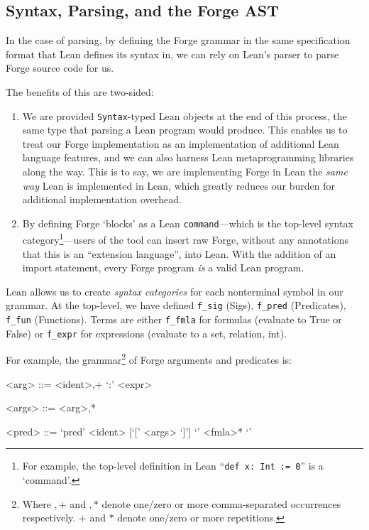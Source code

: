 \subsection{Syntax, Parsing, and the Forge AST}\label{sec:parsing}
In the case of parsing, by defining the Forge grammar in the same specification format that Lean defines its syntax in, we can rely on Lean's parser to parse Forge source code for us.

The benefits of this are two-sided:
\begin{enumerate}
  \item We are provided \texttt{Syntax}-typed Lean objects at the end of this process, the same type that parsing a Lean program would produce. This enables us to treat our Forge implementation as an implementation of additional Lean language features, and we can also harness Lean metaprogramming libraries along the way. This is to say, we are implementing Forge in Lean the \emph{same way} Lean is implemented in Lean, which greatly reduces our burden for additional implementation overhead.
  \item By defining Forge `blocks' as a Lean \texttt{command}---which is the top-level syntax category\footnote{For example, the top-level definition in Lean ``\texttt{def x: Int := 0}'' is a `command'.}---users of the tool can insert raw Forge, without any annotations that this is an ``extension language'', into Lean. With the addition of an import statement, every Forge program \emph{is} a valid Lean program.
\end{enumerate}

Lean allows us to create \emph{syntax categories} for each nonterminal symbol in our grammar. At the top-level, we have defined \texttt{f\_sig} (Sigs), \texttt{f\_pred} (Predicates), \texttt{f\_fun} (Functions). Terms are either \texttt{f\_fmla} for formulas (evaluate to True or False) or \texttt{f\_expr} for expressions (evaluate to a set, relation, int).

For example, the grammar\footnote{Where $,+$ and $,*$ denote one/zero or more comma-separated occurrences respectively. $+$ and $*$ denote one/zero or more repetitions.} of Forge arguments and predicates is:

\vspace{1em}\begin{center}
\begin{minipage}{0.8\textwidth}
\setlength{\grammarindent}{6em}
\begin{grammar}
<arg> ::= <ident>,+ `:' <expr>

<args> ::= <arg>,*

<pred> ::= `pred' <ident> [`[' <args> `]'] `{' <fmla>* `}'
\end{grammar}
\end{minipage}
\end{center}

